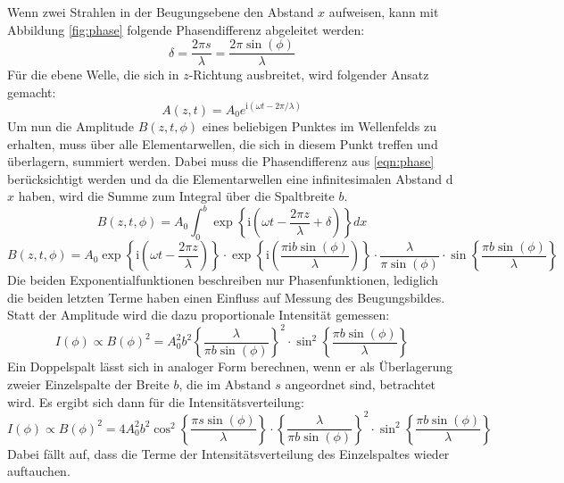Wenn zwei Strahlen in der Beugungsebene den Abstand $x$ aufweisen, kann mit Abbildung \ref{fig:phase} folgende Phasendifferenz abgeleitet werden:
\begin{equation}
  \delta = \frac{2\pi s}{\lambda} = \frac{2 \pi \sin(\phi)}{\lambda}
  \label{eqn:phase}
\end{equation}
Für die ebene Welle, die sich in $z$-Richtung ausbreitet, wird folgender Ansatz gemacht:
\begin{equation}
  A(z,t) = A_0 e^{\text{i}(\omega t - 2\pi / \lambda)}
\end{equation}
Um nun die Amplitude $B(z,t,\phi)$ eines beliebigen Punktes im Wellenfelds zu erhalten, muss über alle Elementarwellen, die sich in diesem Punkt treffen und überlagern, summiert werden.
Dabei muss die Phasendifferenz aus \eqref{eqn:phase} berücksichtigt werden und da die Elementarwellen eine infinitesimalen Abstand d$x$ haben,
wird die Summe zum Integral über die Spaltbreite $b$.
\begin{equation}
  B(z,t,\phi) = A_0 \int_{0}^{b} \exp\left\{\text{i}\left(\omega t - \frac{2\pi z}{\lambda} + \delta \right)\right\} dx
\end{equation}
\begin{equation}
  B(z,t,\phi) = A_0 \exp\left\{\text{i}\left(\omega t - \frac{2\pi z}{\lambda} \right)\right\} \cdot
  \exp\left\{\text{i}\left( \frac{\pi \text{i} b \sin(\phi) }{\lambda} \right)\right\} \cdot
  \frac{\lambda}{\pi \sin(\phi)} \cdot \sin \left\{ \frac{\pi b \sin(\phi)}{\lambda} \right\}
\end{equation}
Die beiden Exponentialfunktionen beschreiben nur Phasenfunktionen, lediglich die beiden letzten Terme haben einen Einfluss auf Messung des Beugungsbildes.
Statt der Amplitude wird die dazu proportionale Intensität gemessen:
\begin{equation}
  I(\phi) \propto B(\phi)^2 = A_0^2 b^2 \left\{\frac{\lambda}{\pi b \sin(\phi)}\right\}^2 \cdot \sin^2 \left\{ \frac{\pi b \sin(\phi)}{\lambda} \right\}
  \label{eqn:einzel}
\end{equation}
Ein Doppelspalt lässt sich in analoger Form berechnen, wenn er als Überlagerung
zweier Einzelspalte der Breite $b$, die im Abstand $s$ angeordnet sind, betrachtet wird.
Es ergibt sich dann für die Intensitätsverteilung:
\begin{equation}
  I(\phi) \propto B(\phi)^2 = 4 A_0^2 b^2 \cos^2 \left\{ \frac{\pi s \sin(\phi)}{\lambda} \right\} \cdot \left\{\frac{\lambda}{\pi b \sin(\phi)}\right\}^2 \cdot \sin^2 \left\{ \frac{\pi b \sin(\phi)}{\lambda} \right\}
  \label{eqn:doppel}
\end{equation}
Dabei fällt auf, dass die Terme der Intensitätsverteilung des Einzelspaltes wieder auftauchen.
